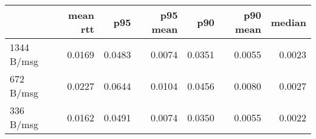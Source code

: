 \begin{tabular}{l|rrrrrr}
\rowcolor{gray!50}
 & mean rtt & p95 & p95 mean & p90 & p90 mean & median\\\hline
1344 B/msg & 0.0169 & 0.0483 & 0.0074 & 0.0351 & 0.0055 & 0.0023 \\
672 B/msg & 0.0227 & 0.0644 & 0.0104 & 0.0456 & 0.0080 & 0.0027 \\
336 B/msg & 0.0162 & 0.0491 & 0.0074 & 0.0350 & 0.0055 & 0.0022 \\
\end{tabular}
